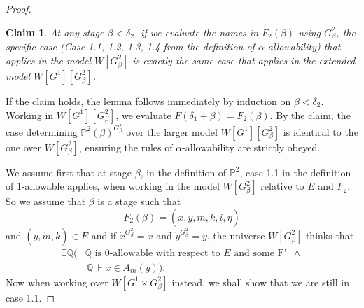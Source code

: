 \documentclass[a4paper,11pt]{article}
\newtheorem{claim}{Claim}
\newcommand{\forceP}{\mathbb{P}}
\newcommand{\forceQ}{\mathbb{Q}}
\begin{document}
\begin{proof}
\begin{claim}
At any stage $\beta < \delta_2$, if we evaluate the names in $F_2(\beta)$ using $G^2_\beta$, the specific case (Case 1.1, 1.2, 1.3, 1.4 from the definition of $\alpha$-allowability) that applies in the model $W[G^2_\beta]$ is exactly the same case that applies in the extended model $W[G^1][G^2_\beta]$.
\end{claim}


If the claim holds, the lemma follows immediately by induction on $\beta < \delta_2$. Working in $W[G^1][G^2_\beta]$, we evaluate $F(\delta_1 + \beta) = F_2(\beta)$. By the claim, the case determining $\mathbb{P}^2(\beta)^{G^2_\beta}$ over the larger model $W[G^1][G^2_\beta]$ is identical to the one over $W[G^2_\beta]$, ensuring the rules of $\alpha$-allowability are strictly obeyed.



\medskip

We assume first that at stage $\beta$, in the definition of $ \forceP^2$,  case 1.1 in the definition of 1-allowable applies, when working in the model $W[G^2_{\beta}]$ relative to $E$ and $F_2$. So we assume that $\beta$ is a stage such that
\[ F_2(\beta) = (\dot{x},\dot{y},\dot{m},\dot{k},i,\dot{\eta}) \]
and $(\dot{y},\dot{m},\dot{k}) \in E$ and if $\dot{x}^{G^2_{\beta}}=x$ and $\dot{y}^{G^2_{\beta}}=y$, the universe $W[ G^2_{\beta}]$ thinks that
\begin{align*}
\exists \forceQ (&\forceQ \text{ is } 0 \text{-allowable with respect to } E \text{ and some F' }\,  \land \\& \, \forceQ \Vdash {x} \in A_m({y})).
\end{align*}
Now when working over $W[G^1 \times G^2_{\beta}]$ instead, we shall show that
we are still in case 1.1.


\end{proof}
\end{document}
